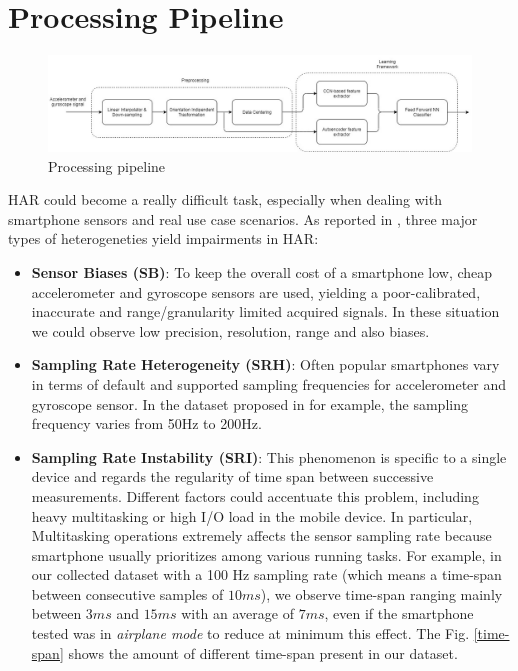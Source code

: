 
\newcommand*{\x}{\boldsymbol{x}}
\newcommand*{\y}{\boldsymbol{y}}
\newcommand*{\z}{\boldsymbol{z}}
\newcommand*{\xm}{\bar{\x}}

\section{Processing Pipeline}
\label{sec:processing-pipeline}

\begin{figure}[h]
	\centering
	\includegraphics[width=1\textwidth]{images/processing_pipeline.jpg}
	\caption{Processing pipeline}
	\label{fig:processing-pipeline}
\end{figure}

HAR could become a really difficult task, especially when dealing with smartphone sensors and real use case scenarios. As reported in \cite{blunck2013heterogeneity}, three major types of heterogeneties yield impairments in HAR:
\begin{itemize}
	\item \textbf{Sensor Biases (SB)}: To keep the overall cost of a smartphone low, cheap accelerometer and gyroscope sensors are used, yielding a poor-calibrated, inaccurate and range/granularity limited acquired signals. In these situation we could observe low precision, resolution, range and also biases.
	\item \textbf{Sampling Rate Heterogeneity (SRH)}: Often popular smartphones vary in terms of default and supported sampling frequencies for accelerometer and gyroscope sensor. In the dataset proposed in \cite{stisen2015smart} for example, the sampling frequency varies from 50Hz to 200Hz.
	\item \textbf{Sampling Rate Instability (SRI)}: This phenomenon is specific to a single device and regards the regularity of time span between successive measurements. Different factors could accentuate this problem, including heavy multitasking or high I/O load in the mobile device. In particular, Multitasking operations extremely affects the sensor sampling rate because smartphone usually prioritizes among various running tasks. For example, in our collected dataset with a 100 Hz sampling rate (which means a time-span between consecutive samples of $10ms$), we observe time-span ranging mainly between $3ms$ and $15ms$ with an average of $7ms$, even if the smartphone tested was in \textit{airplane mode} to reduce at minimum this effect. The Fig. \ref{time-span} shows the amount of different time-span present in our dataset.
\end{itemize}

